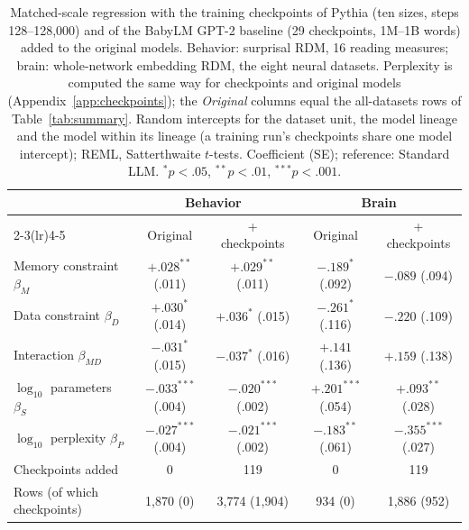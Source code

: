 \begin{table}[t]
\centering
\small
\setlength{\tabcolsep}{5pt}
\caption{Matched-scale regression with the training checkpoints of Pythia (ten sizes, steps 128--128{,}000) and of the BabyLM
GPT-2 baseline (29 checkpoints, 1M--1B words) added to the original models. Behavior: surprisal RDM, 16 reading measures; brain:
whole-network embedding RDM, the eight neural datasets. Perplexity is computed the same way for checkpoints and original models
(Appendix~\ref{app:checkpoints}); the \emph{Original} columns equal the all-datasets rows of Table~\ref{tab:summary}. Random intercepts for the dataset unit, the model lineage and the
model within its lineage (a training run's checkpoints share one model intercept); REML, Satterthwaite $t$-tests.
Coefficient (SE); reference: Standard LLM. $^{*}p<.05$, $^{**}p<.01$, $^{***}p<.001$.}
\label{tab:rsa-ckpt}
\begin{tabular}{lcccc}
\toprule
 & \multicolumn{2}{c}{Behavior} & \multicolumn{2}{c}{Brain} \\
\cmidrule(lr){2-3}\cmidrule(lr){4-5}
 & Original & + checkpoints & Original & + checkpoints \\
\midrule
Memory constraint $\beta_M$ & $+.028^{**}$ (.011) & $+.029^{**}$ (.011) & $-.189^{*}$ (.092) & $-.089$ (.094) \\
Data constraint $\beta_D$ & $+.030^{*}$ (.014) & $+.036^{*}$ (.015) & $-.261^{*}$ (.116) & $-.220$ (.109) \\
Interaction $\beta_{MD}$ & $-.031^{*}$ (.015) & $-.037^{*}$ (.016) & $+.141$ (.136) & $+.159$ (.138) \\
$\log_{10}$ parameters $\beta_S$ & $-.033^{***}$ (.004) & $-.020^{***}$ (.002) & $+.201^{***}$ (.054) & $+.093^{**}$ (.028) \\
$\log_{10}$ perplexity $\beta_P$ & $-.027^{***}$ (.004) & $-.021^{***}$ (.002) & $-.183^{**}$ (.061) & $-.355^{***}$ (.027) \\
\midrule
Checkpoints added & 0 & 119 & 0 & 119 \\
Rows (of which checkpoints) & 1,870 (0) & 3,774 (1,904) & 934 (0) & 1,886 (952) \\
\bottomrule
\end{tabular}
\end{table}
